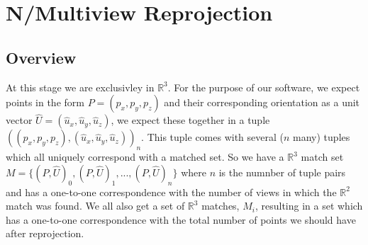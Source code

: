 \chapter{N/Multiview Reprojection}

\section{Overview}
At this stage we are exclusivley in $\mathbb{R}^{3}$.
For the purpose of our software, we expect points in the form $P = (p_x, p_y, p_z)$
and their corresponding orientation as a unit vector $\hat{U} = (\hat{u}_x, \hat{u}_y, \hat{u}_z)$,
we expect these together in a tuple $ ((p_x, p_y, p_z), (\hat{u}_x, \hat{u}_y, \hat{u}_z))_n $.
This tuple comes with several ($n$ many) tuples which all uniquely correspond with a matched set.
So we have a $\mathbb{R}^{3}$ match set $M = \{ (P, \hat{U})_0, (P, \hat{U})_1, ... , (P, \hat{U})_n \}$
where $n$ is the numnber of tuple pairs and has a one-to-one correspondence with
the number of views in which the $\mathbb{R}^{2}$ match was found.
We all also get a set of $\mathbb{R}^{3}$ matches,
$M_i$,
resulting in a set which has a one-to-one correspondence with the total number
of points we should have after reprojection.

\begin{center}
\end{center}

